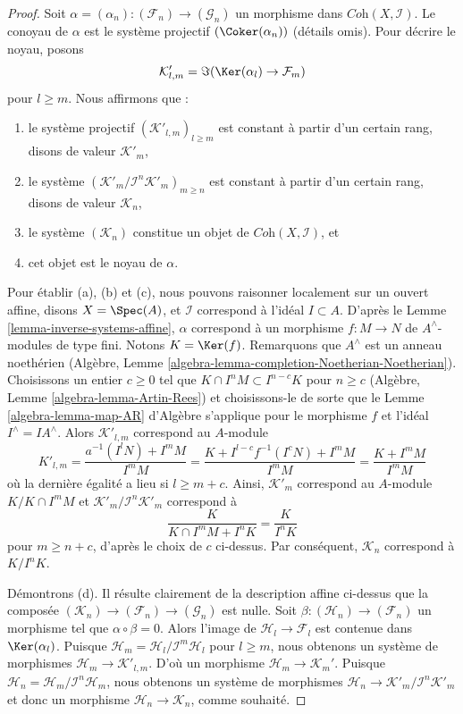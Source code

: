 \begin{proof}
Soit $\alpha =(\alpha_n) : (\mathcal{F}_n) \to (\mathcal{G}_n)$ un morphisme dans
$\textit{Coh}(X, \mathcal{I})$. Le conoyau de $\alpha$ est le système projectif
$(\Coker(\alpha_n))$ (détails omis). Pour décrire le noyau, posons
$$
\mathcal{K}'_{l, m} = \Im(\Ker(\alpha_l) \to \mathcal{F}_m)
$$
pour $l \geq m$.
Nous affirmons que :
\begin{enumerate}
\item[(a)] le système projectif $(\mathcal{K}'_{l, m})_{l \geq m}$ est
constant à partir d'un certain rang, disons de valeur $\mathcal{K}'_m$,
\item[(b)] le système $(\mathcal{K}'_m/\mathcal{I}^n\mathcal{K}'_m)_{m \geq n}$
est constant à partir d'un certain rang, disons de valeur $\mathcal{K}_n$,
\item[(c)] le système $(\mathcal{K}_n)$ constitue un objet de
$\textit{Coh}(X, \mathcal{I})$, et
\item[(d)] cet objet est le noyau de $\alpha$.
\end{enumerate}
Pour établir (a), (b) et (c), nous pouvons raisonner localement sur un ouvert affine, disons $X = \Spec(A)$,
et $\mathcal{I}$ correspond à l'idéal $I \subset A$. D'après le
Lemme \ref{lemma-inverse-systems-affine},
$\alpha$ correspond à un morphisme $f : M \to N$ de $A^\wedge$-modules de type fini.
Notons $K = \Ker(f)$. Remarquons que $A^\wedge$ est un anneau
noethérien (Algèbre, Lemme \ref{algebra-lemma-completion-Noetherian-Noetherian}).
Choisissons un entier $c \geq 0$ tel que
$K \cap I^n M \subset I^{n - c}K$ pour $n \geq c$
(Algèbre, Lemme \ref{algebra-lemma-Artin-Rees})
et choisissons-le de sorte que le Lemme \ref{algebra-lemma-map-AR} d'Algèbre s'applique
pour le morphisme $f$ et l'idéal $I^\wedge = IA^\wedge$. Alors
$\mathcal{K}'_{l, m}$ correspond au $A$-module
$$
K'_{l, m} = \frac{a^{-1}(I^lN) + I^mM}{I^mM} =
\frac{K + I^{l - c}f^{-1}(I^cN) + I^mM}{I^mM} =
\frac{K + I^mM}{I^mM}
$$
où la dernière égalité a lieu si $l \geq m + c$. Ainsi, $\mathcal{K}'_m$
correspond au $A$-module $K/K \cap I^mM$ et
$\mathcal{K}'_m/\mathcal{I}^n\mathcal{K}'_m$ correspond à
$$
\frac{K}{K \cap I^mM + I^nK} = \frac{K}{I^nK}
$$
pour $m \geq n + c$, d'après le choix de $c$ ci-dessus. Par conséquent, $\mathcal{K}_n$
correspond à $K/I^nK$.

\medskip\noindent
Démontrons (d). Il résulte clairement de la description affine ci-dessus que
la composée $(\mathcal{K}_n) \to (\mathcal{F}_n) \to (\mathcal{G}_n)$
est nulle. Soit $\beta : (\mathcal{H}_n) \to (\mathcal{F}_n)$
un morphisme tel que $\alpha \circ \beta = 0$. Alors
l'image de $\mathcal{H}_l \to \mathcal{F}_l$ est contenue dans $\Ker(\alpha_l)$.
Puisque $\mathcal{H}_m = \mathcal{H}_l/\mathcal{I}^m\mathcal{H}_l$
pour $l \geq m$, nous obtenons un système de morphismes
$\mathcal{H}_m \to \mathcal{K}'_{l, m}$. D'où un morphisme
$\mathcal{H}_m \to \mathcal{K}_m'$. Puisque
$\mathcal{H}_n = \mathcal{H}_m/\mathcal{I}^n\mathcal{H}_m$, nous obtenons
un système de morphismes $\mathcal{H}_n \to \mathcal{K}'_m/\mathcal{I}^n\mathcal{K}'_m$
et donc un morphisme $\mathcal{H}_n \to \mathcal{K}_n$, comme souhaité.


\end{proof}
